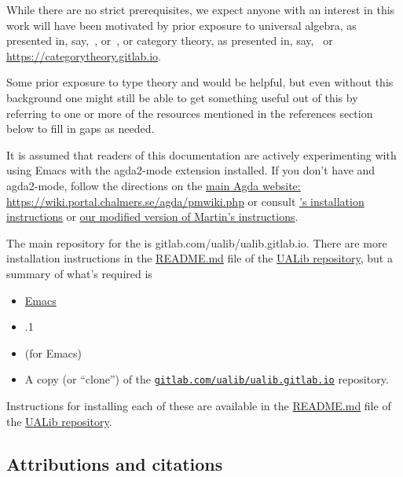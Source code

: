 While there are no strict prerequisites, we expect anyone with an interest in this work will have been motivated by prior exposure to universal algebra, as presented in, say,~\cite{Bergman:2012}, or~\cite{McKenzie:1987}, or category theory, as presented in, say,~\cite{Riehl:2017} or \url{https://categorytheory.gitlab.io}.

Some prior exposure to type theory and \agda would be helpful, but even without this background one might still be able to get something useful out of this by referring to one or more of the resources mentioned in the references section below to fill in gaps as needed.

It is assumed that readers of this documentation are actively experimenting with \agda using Emacs with the
agda2-mode extension installed. If you don't have \agda and agda2-mode, follow the directions on the \href{https://wiki.portal.chalmers.se/agda/pmwiki.php}{main Agda website: https://wiki.portal.chalmers.se/agda/pmwiki.php} or
consult \href{https://github.com/martinescardo/HoTT-UF-Agda-Lecture-Notes/blob/master/INSTALL.md}{\MartinEscardo's installation instructions} or \href{https://gitlab.com/ualib/ualib.gitlab.io/-/blob/master/INSTALL_AGDA.md}{our
modified version of Martin's instructions}.

The main repository for the \agdaualib is gitlab.com/ualib/ualib.gitlab.io. There are more installation instructions in the \href{https://gitlab.com/ualib/ualib.gitlab.io/README.md}{README.md} file of the \href{https://gitlab.com/ualib/ualib.gitlab.io}{UALib repository}, but a summary of what's required is
\begin{itemize}
\item \href{https://www.gnu.org/software/emacs/}{Emacs}
\item {}.1
\item \agdamode (for Emacs)
\item A copy (or ``clone'') of the \href{https://gitlab.com/ualib/ualib.gitlab.io}{\texttt{gitlab.com/ualib/ualib.gitlab.io}} repository.
\end{itemize}

Instructions for installing each of these are available in the \href{https://gitlab.com/ualib/ualib.gitlab.io/README.md}{README.md} file of the \href{https://gitlab.com/ualib/ualib.gitlab.io}{UALib repository}.

\subsection*{Attributions and citations}


